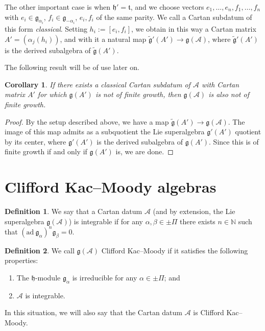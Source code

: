\documentclass[12pt, a4paper, reqno]{amsart}
\def\AA{\mathcal{A}}
\def\g{\mathfrak{g}}
\def\h{\mathfrak{h}}
\newtheorem{corollary}{Corollary}
\theoremstyle{definition}
\newtheorem{definition}{Definition}
\theoremstyle{definition}
\theoremstyle{definition}
\numberwithin{theorem}{section}
\numberwithin{lemma}{section}
\numberwithin{remark}{section}
\numberwithin{definition}{section}
\numberwithin{corollary}{section}
\numberwithin{proposition}{section}
\numberwithin{example}{section}
\begin{document}
	The other important case is when $\h'=\mathfrak{t}$, and we choose vectors $e_1,\dots,e_n,f_1,\dots,f_n$ with $e_i\in\g_{\alpha_i}$, $f_i\in\g_{-\alpha_i}$, $e_i,f_i$ of the same parity.  We call a Cartan subdatum of this form \emph{classical}. Setting $h_i:=[e_i,f_i]$, we obtain in this way a Cartan matrix $A'=(\alpha_j(h_i))$, and with it a natural map $\tilde{\g}'(A')\to\g(\AA)$, where $\tilde{\g}'(A')$ is the derived subalgebra of $\tilde{\g}(A')$.
	
	The following result will be of use later on.  
	\begin{corollary}
		If there exists a classical Cartan subdatum of $\AA$ with Cartan matrix $A'$ for which $\g(A')$ is not of finite growth, then $\g(\AA)$ is also not of finite growth.
	\end{corollary}
	
	\begin{proof}
		By the setup described above, we have a map $\tilde{\g}(A')\to\g(\AA)$.  The image of this map admits as a subquotient the Lie superalgebra $\g'(A')$ quotient by its center, where $\g'(A')$ is the derived subalgebra of $\g(A')$.  Since this is of finite growth if and only if $\g(A')$ is, we are done.
	\end{proof}
	
	\section{Clifford Kac--Moody algebras}
	
	\begin{definition}\label{definition-integrable}
		We say that a Cartan datum $\AA$ (and by extension, the Lie superalgebra \(\mathfrak{g}(\AA)\)) is integrable if for any \(\alpha,\beta \in \pm \Pi\) there exists \(n \in \mathbb{N}\) such that \((\mathrm{ad}\ \mathfrak{g}_{\alpha})^n \mathfrak{g}_{\beta} = 0\).
	\end{definition}
	
	\begin{definition}
		We call \(\mathfrak{g}(\mathcal{A})\) Clifford Kac--Moody if it satisfies the following properties:
		\begin{enumerate}
			\item The \(\mathfrak{h}\)-module \(\mathfrak{g}_{\alpha}\) is irreducible for any \(\alpha \in \pm\Pi\); and
			\item $\AA$ is integrable.
		\end{enumerate}
		In this situation, we will also say that the Cartan datum $\AA$ is Clifford Kac--Moody.
	\end{definition}
	
\end{document}
